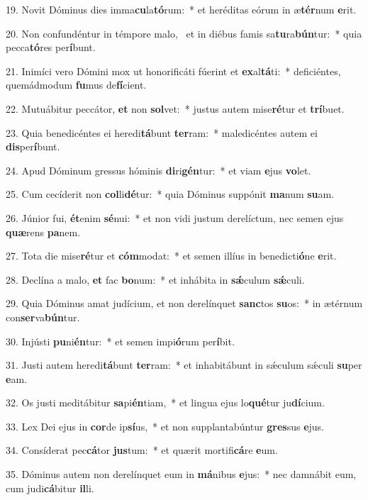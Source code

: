 19. Novit Dóminus dies imma\textbf{cu}la\textbf{tó}rum:~*  et heréditas eórum in æ\textbf{tér}num \textbf{e}rit.\

20. Non confundéntur in témpore malo, \dag\  et in diébus famis sa\textbf{tu}ra\textbf{bún}tur:~*  quia pecca\textbf{tó}res per\textbf{í}bunt.\

21. Inimíci vero Dómini mox ut honorificáti fúerint et \textbf{ex}al\textbf{tá}ti:~*  deficiéntes, quemádmodum \textbf{fu}mus de\textbf{fí}cient.\

22. Mutuábitur peccátor, \textbf{et} non \textbf{sol}vet:~*  justus autem mise\textbf{ré}tur et \textbf{trí}buet.\

23. Quia benedicéntes ei heredi\textbf{tá}bunt \textbf{ter}ram:~*  maledicéntes autem ei \textbf{dis}per\textbf{í}bunt.\

24. Apud Dóminum gressus hóminis \textbf{di}ri\textbf{gén}tur:~*  et viam \textbf{e}jus \textbf{vo}let.\

25. Cum cecíderit non \textbf{col}li\textbf{dé}tur:~*  quia Dóminus suppónit \textbf{ma}num \textbf{su}am.\

26. Júnior fui, \textbf{ét}enim \textbf{sé}nui:~*  et non vidi justum derelíctum, nec semen ejus \textbf{quæ}rens \textbf{pa}nem.\

27. Tota die mise\textbf{ré}tur et \textbf{cóm}modat:~*  et semen illíus in benedicti\textbf{ó}ne \textbf{e}rit.\

28. Declína a malo, \textbf{et} fac \textbf{bo}num:~*  et inhábita in \textbf{sǽ}culum \textbf{sǽ}culi.\

29. Quia Dóminus amat judícium, et non derelínquet \textbf{sanc}tos \textbf{su}os:~*  in ætérnum con\textbf{ser}va\textbf{bún}tur.\

30. Injústi \textbf{pu}ni\textbf{én}tur:~*  et semen impi\textbf{ó}rum per\textbf{í}bit.\

31. Justi autem heredi\textbf{tá}bunt \textbf{ter}ram:~*  et inhabitábunt in sǽculum sǽculi \textbf{su}per \textbf{e}am.\

32. Os justi meditábitur \textbf{sa}pi\textbf{én}tiam,~*  et lingua ejus lo\textbf{qué}tur ju\textbf{dí}cium.\

33. Lex Dei ejus in \textbf{cor}de ip\textbf{sí}us,~*  et non supplantabúntur \textbf{gres}sus \textbf{e}jus.\

34. Consíderat pec\textbf{cá}tor \textbf{jus}tum:~*  et quærit mortifi\textbf{cá}re \textbf{e}um.\

35. Dóminus autem non derelínquet eum in \textbf{má}nibus \textbf{e}jus:~*  nec damnábit eum, cum judi\textbf{cá}bitur \textbf{il}li.\

